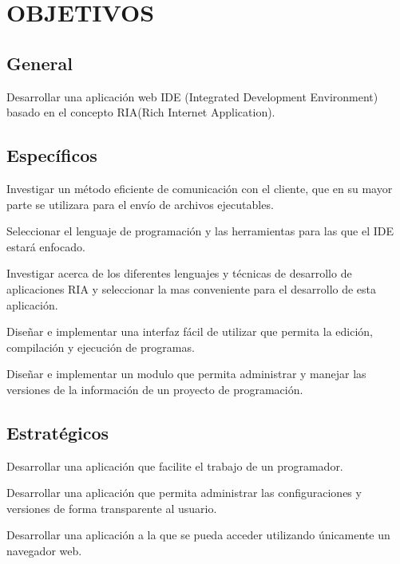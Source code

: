 \section{OBJETIVOS}

\subsection{General}

Desarrollar una aplicación web IDE (Integrated Development Environment) basado en el concepto RIA(Rich Internet Application).

\subsection{Específicos}

Investigar un método eficiente de comunicación con el cliente, que en su mayor parte se utilizara para el envío de archivos ejecutables.

Seleccionar el lenguaje de programación y las herramientas para las que el IDE estará enfocado.

Investigar acerca de los diferentes lenguajes y técnicas de desarrollo de aplicaciones RIA y seleccionar la mas conveniente para el desarrollo de esta aplicación.

Diseñar e implementar una interfaz fácil de utilizar que permita la edición, compilación y ejecución de programas.

Diseñar e implementar un modulo que permita administrar y manejar las versiones de la información de un proyecto de programación.

\subsection{Estratégicos}

Desarrollar una aplicación que facilite el trabajo de un programador.

Desarrollar una aplicación que permita administrar las configuraciones y versiones de forma transparente al usuario.

Desarrollar una aplicación a la que se pueda acceder utilizando únicamente un navegador web.
